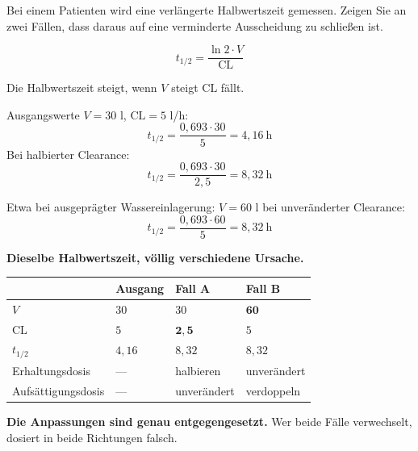 \begin{aufgabe}
Bei einem Patienten wird eine verlängerte Halbwertszeit gemessen. Zeigen Sie an zwei Fällen, dass daraus  auf eine verminderte Ausscheidung zu schließen ist.

\loesung
{}
\[ t_{1/2} = \frac{\ln 2 \cdot V}{\mathrm{CL}} \]

Die Halbwertszeit steigt, wenn $V$ steigt  $\mathrm{CL}$ fällt.

Ausgangswerte $V = 30$ l, $\mathrm{CL} = 5$ l/h:
\[ t_{1/2} = \frac{0{,}693 \cdot 30}{5} = 4{,}16\ \mathrm{h} \]
Bei halbierter Clearance:
\[ t_{1/2} = \frac{0{,}693 \cdot 30}{2{,}5} = 8{,}32\ \mathrm{h} \]

Etwa bei ausgeprägter Wassereinlagerung: $V = 60$ l bei unveränderter Clearance:
\[ t_{1/2} = \frac{0{,}693 \cdot 60}{5} = 8{,}32\ \mathrm{h} \]

\textbf{Dieselbe Halbwertszeit, völlig verschiedene Ursache.}

\begin{center}
{\small
\renewcommand{\arraystretch}{1.5}
\begin{tabular}{@{}P{2.4cm}P{1.6cm}P{2.0cm}P{2.1cm}@{}}
\toprule
& \textbf{Ausgang} & \textbf{Fall A} & \textbf{Fall B}\\
\midrule
$V$ & $30$ & $30$ & $\mathbf{60}$\\
$\mathrm{CL}$ & $5$ & $\mathbf{2{,}5}$ & $5$\\
$t_{1/2}$ & $4{,}16$ & $8{,}32$ & $8{,}32$\\
\midrule
Erhaltungs\-dosis & --- & \textcolor{akzent}{halbieren} & \textcolor{gruen}{unverändert}\\
Aufsättigungs\-dosis & --- & \textcolor{gruen}{unverändert} & \textcolor{akzent}{verdoppeln}\\
\bottomrule
\end{tabular}}
\end{center}

\begin{center}
\begin{minipage}{0.9\textwidth}
\textbf{Die Anpassungen sind genau entgegengesetzt.} Wer beide Fälle verwechselt, dosiert in beide Richtungen falsch.
\end{minipage}
\end{center}


\end{aufgabe}
